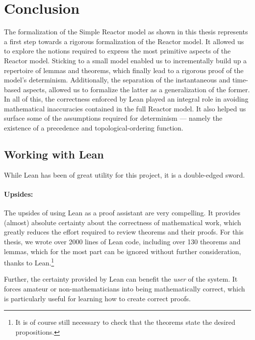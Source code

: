 \section{Conclusion}
\label{section:conclusion}

The formalization of the Simple Reactor model as shown in this thesis represents a first step towards a rigorous formalization of the Reactor model.
It allowed us to explore the notions required to express the most primitive aspects of the Reactor model.
Sticking to a small model enabled us to incrementally build up a repertoire of lemmas and theorems, which finally lead to a rigorous proof of the model's determinism.
Additionally, the separation of the instantaneous and time-based aspects, allowed us to formalize the latter as a generalization of the former.
In all of this, the correctness enforced by Lean played an integral role in avoiding mathematical inaccuracies contained in the full Reactor model.
It also helped us surface some of the assumptions required for determinism --- namely the existence of a precedence and topological-ordering function.

\subsection{Working with Lean}

While Lean has been of great utility for this project, it is a double-edged sword.

\paragraph{Upsides:}

The upsides of using Lean as a proof assistant are very compelling.
It provides (almost) absolute certainty about the correctness of mathematical work, which greatly reduces the effort required to review theorems and their proofs.
For this thesis, we wrote over 2000 lines of Lean code, including over 130 theorems and lemmas, which for the most part can be ignored without further consideration, thanks to Lean.\footnote{
    It is of course still necessary to check that the theorems state the desired propositions.
}

Further, the certainty provided by Lean can benefit the \emph{user} of the system.
It forces amateur or non-mathematicians into being mathematically correct, which is particularly useful for learning how to create correct proofs.

